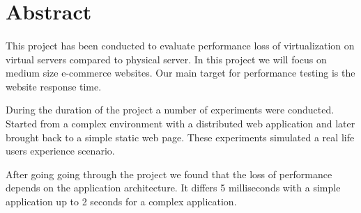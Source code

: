 \section*{Abstract}
\paragraph{}
This project has been conducted to evaluate performance loss of virtualization on virtual servers compared to physical server. In this project we will focus on medium size e-commerce websites. Our main target for performance testing is the website response time. \par
During the duration of the project a number of experiments were conducted. Started from a complex environment with a distributed web application and later brought back to a simple static web page. These experiments simulated a real life users experience scenario.
\par
After going going through the project we found that the loss of performance depends on the application architecture. It differs 5 milliseconds with a simple application up to 2 seconds for a complex application.